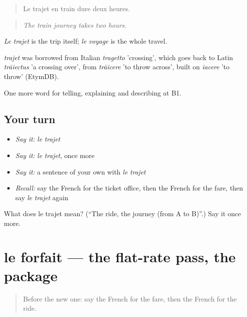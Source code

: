 \begin{quote}
Le trajet en train dure deux heures.
\end{quote}

\begin{quote}
\emph{The train journey takes two hours.}
\end{quote}

\emph{Le trajet} is the trip itself; \emph{le voyage} is the whole travel.

\begin{cousinweb}
\emph{trajet} was borrowed from Italian \emph{tragetto} 'crossing', which goes back to Latin \emph{trāiectus} 'a crossing over', from \emph{trāicere} 'to throw across', built on \emph{iacere} 'to throw' (EtymDB).
\end{cousinweb}

\begin{grammarlens}[title={What you've built}]
One more word for telling, explaining and describing at B1.
\end{grammarlens}

\subsection*{Your turn}
\begin{itemize}
\raggedright
  \item \emph{Say it:} \emph{le trajet}
  \item \emph{Say it:} \emph{le trajet}, once more
  \item \emph{Say it:} a sentence of your own with \emph{le trajet}
  \item \emph{Recall:} say the French for the ticket office, then the French for the fare, then say \emph{le trajet} again
\end{itemize}

\begin{tcolorbox}[breakable,colback=teal!4,colframe=teal!35!black,title={Before you move on}]
What does le trajet mean? (\textquotedblleft{}The ride, the journey (from A to B)\textquotedblright{}.) Say it once more.
\end{tcolorbox}
\section[le forfait]{le forfait — the flat-rate pass, the package}

\label{lesson:FR-C412-forfait}



\begin{quote}
Before the new one: say the French for the fare, then the French for the ride.
\end{quote}

